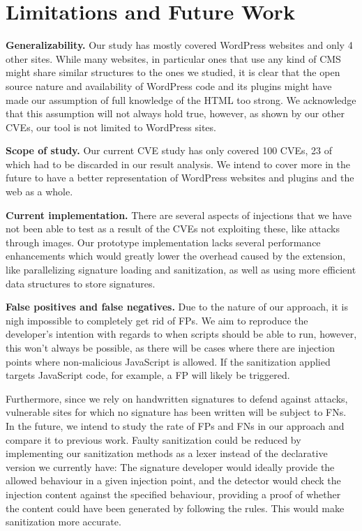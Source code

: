 \section{Limitations and Future Work}
\textbf{Generalizability.} Our study has mostly covered WordPress websites and only 4 other sites. While many websites, in particular ones that use any kind of CMS might share similar structures to the ones we studied, it is clear that the open source nature and availability of WordPress code and its plugins might have made our assumption of full knowledge of the HTML too strong. We acknowledge that this assumption will not always hold true, however, as shown by our other CVEs, our tool is not limited to WordPress sites.

\textbf{Scope of study.} Our current CVE study has only covered 100 CVEs, 23 of which had to be discarded in our result analysis. We intend to cover more in the future to have a better representation of WordPress websites and plugins and the web as a whole. 

\textbf{Current implementation.} There are several aspects of injections that we have not been able to test as a result of the CVEs not exploiting these, like attacks through images. Our prototype implementation lacks several performance enhancements which would greatly lower the overhead caused by the extension, like parallelizing signature loading and sanitization, as well as using more efficient data structures to store signatures. 

\textbf{False positives and false negatives.} Due to the nature of our approach, it is nigh impossible to completely get rid of FPs. We aim to reproduce the developer's intention with regards to when scripts should be able to run, however, this won't always be possible, as there will be cases where there are injection points where non-malicious JavaScript is allowed. If the sanitization applied targets JavaScript code, for example, a FP will likely be triggered.

Furthermore, since we rely on handwritten signatures to defend against attacks, vulnerable sites for which no signature has been written will be subject to FNs. In the future, we intend to study the rate of FPs and FNs in our approach and compare it to previous work. Faulty sanitization could be reduced by implementing our sanitization methods as a lexer instead of the declarative version we currently have: The signature developer would ideally provide the allowed behaviour in a given injection point, and the detector would check the injection content against the specified behaviour, providing a proof of whether the content could have been generated by following the rules. This would make sanitization more accurate.

